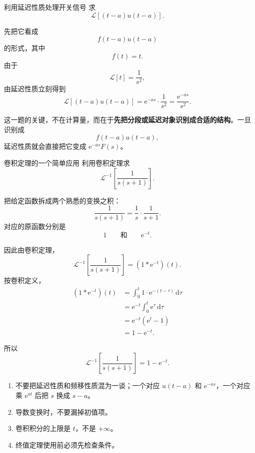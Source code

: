 \begin{lizi}{利用延迟性质处理开关信号}{}
求
\[
    \mathcal{L}[(t-a)u(t-a)].
\]

\begin{jie}
先把它看成
\[
    f(t-a)u(t-a)
\]
的形式，其中
\[
    f(t)=t.
\]
由于
\[
    \mathcal{L}[t]=\frac{1}{s^2},
\]
由延迟性质立刻得到
\[
    \mathcal{L}[(t-a)u(t-a)]
    =
    \mathrm{e}^{-as}\cdot \frac{1}{s^2}
    =
    \frac{\mathrm{e}^{-as}}{s^2}.
\]

这一题的关键，不在计算量，而在于\textbf{先把分段或延迟对象识别成合适的结构}。一旦识别成
\[
    f(t-a)u(t-a),
\]
延迟性质就会直接把它变成 $\mathrm{e}^{-as}F(s)$。
\end{jie}
\end{lizi}

\begin{lizi}{卷积定理的一个简单应用}{}
利用卷积定理求
\[
    \mathcal{L}^{-1}\left[\frac{1}{s(s+1)}\right].
\]

\begin{jie}
把给定函数拆成两个熟悉的变换之积：
\[
    \frac{1}{s(s+1)}
    =
    \frac{1}{s}\cdot \frac{1}{s+1}.
\]
对应的原函数分别是
\[
    1
    \qquad \text{和} \qquad
    \mathrm{e}^{-t}.
\]

因此由卷积定理，
\[
    \mathcal{L}^{-1}\left[\frac{1}{s(s+1)}\right]
    =
    (1*\mathrm{e}^{-t})(t).
\]
按卷积定义，
\begin{align}
    (1*\mathrm{e}^{-t})(t)
    &=
    \int_0^t 1\cdot \mathrm{e}^{-(t-\tau)}\,\mathrm{d}\tau \\
    &=
    \mathrm{e}^{-t}\int_0^t \mathrm{e}^{\tau}\,\mathrm{d}\tau \\
    &=
    \mathrm{e}^{-t}(\mathrm{e}^t-1) \\
    &=
    1-\mathrm{e}^{-t}.
\end{align}

所以
\[
    \mathcal{L}^{-1}\left[\frac{1}{s(s+1)}\right]
    =
    1-\mathrm{e}^{-t}.
\]
\end{jie}
\end{lizi}

\begin{jinshi}[这一节最容易错的地方]
\begin{enumerate}
    \item 不要把延迟性质和频移性质混为一谈；一个对应 $u(t-a)$ 和 $\mathrm{e}^{-as}$，一个对应乘 $\mathrm{e}^{at}$ 后把 $s$ 换成 $s-a$。
    \item 导数变换时，不要漏掉初值项。
    \item 卷积积分的上限是 $t$，不是 $+\infty$。
    \item 终值定理使用前必须先检查条件。
\end{enumerate}
\end{jinshi}


